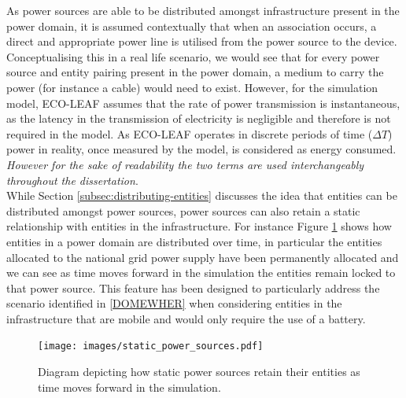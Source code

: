 \documentclass{l4proj}
\begin{document}
As power sources are able to be distributed amongst infrastructure present in the power domain, it is assumed contextually that when an association occurs, a direct and appropriate power line is utilised from the power source to the device.
Conceptualising this in a real life scenario, we would see that for every power source and entity pairing present in the power domain, a medium to carry the power (for instance a cable) would need to exist.
However, for the simulation model, ECO-LEAF assumes that the rate of power transmission is instantaneous, as the latency in the transmission of electricity is negligible \citep{speed-of-electricity} and therefore is not required in the model.
As ECO-LEAF operates in discrete periods of time ($\varDelta T$) power in reality, once measured by the model, is considered as energy consumed.
\textit{However for the sake of readability the two terms are used interchangeably throughout the dissertation}.\\

While Section \ref{subsec:distributing-entities} discusses the idea that entities can be distributed amongst power sources, power sources can also retain a static relationship with entities in the infrastructure.
For instance Figure \ref{fig:staticPower} shows how entities in a power domain are distributed over time, in particular the entities allocated to the national grid power supply have been permanently allocated and we can see as time moves forward in the simulation the entities remain locked to that power source.
This feature has been designed to particularly address the scenario identified in \ref{DOMEWHER} when considering entities in the infrastructure that are mobile and would only require the use of a battery.

\begin{figure}[h]
    \centering
    \texttt{[image: images/static\_power\_sources.pdf]}
    ~
    \caption{Diagram depicting how static power sources retain their entities as time moves forward in the simulation.}
    \label{fig:staticPower}
\end{figure}
\end{document}
